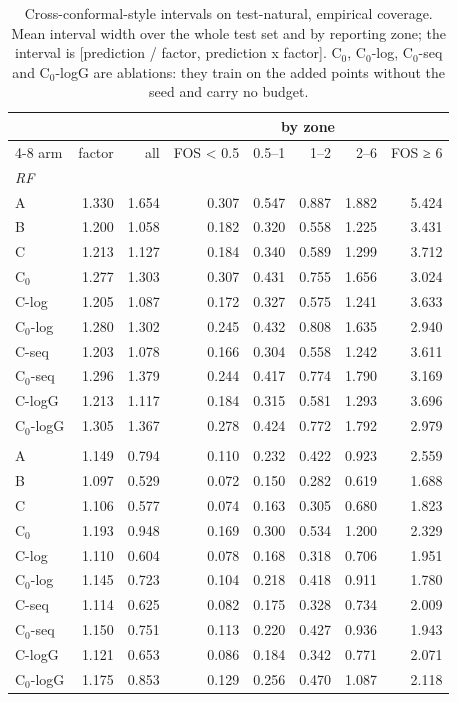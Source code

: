 \begin{table}[htbp]
\centering
\caption{Cross-conformal-style intervals on test-natural, empirical coverage. Mean interval width over the whole test set and by reporting zone; the interval is [prediction / factor, prediction x factor]. C$_0$, C$_0$-log, C$_0$-seq and C$_0$-logG are ablations: they train on the added points without the seed and carry no budget.}
\label{tab:test-natural__fos-rmse:conformal:width}
\begin{tabular}{lrrrrrrr}
\toprule
 &  &  & \multicolumn{5}{c}{by zone} \\
\cmidrule(lr){4-8}
arm & factor & all & FOS < 0.5 & 0.5–1 & 1–2 & 2–6 & FOS ≥ 6 \\
\midrule
\multicolumn{8}{l}{\textit{RF}} \\
A & 1.330 & 1.654 & 0.307 & 0.547 & 0.887 & 1.882 & 5.424 \\
B & 1.200 & 1.058 & 0.182 & 0.320 & 0.558 & 1.225 & 3.431 \\
C & 1.213 & 1.127 & 0.184 & 0.340 & 0.589 & 1.299 & 3.712 \\
C$_0$ & 1.277 & 1.303 & 0.307 & 0.431 & 0.755 & 1.656 & 3.024 \\
C-log & 1.205 & 1.087 & 0.172 & 0.327 & 0.575 & 1.241 & 3.633 \\
C$_0$-log & 1.280 & 1.302 & 0.245 & 0.432 & 0.808 & 1.635 & 2.940 \\
C-seq & 1.203 & 1.078 & 0.166 & 0.304 & 0.558 & 1.242 & 3.611 \\
C$_0$-seq & 1.296 & 1.379 & 0.244 & 0.417 & 0.774 & 1.790 & 3.169 \\
C-logG & 1.213 & 1.117 & 0.184 & 0.315 & 0.581 & 1.293 & 3.696 \\
C$_0$-logG & 1.305 & 1.367 & 0.278 & 0.424 & 0.772 & 1.792 & 2.979 \\
\addlinespace
\multicolumn{8}{l}{\textit{GBM}} \\
A & 1.149 & 0.794 & 0.110 & 0.232 & 0.422 & 0.923 & 2.559 \\
B & 1.097 & 0.529 & 0.072 & 0.150 & 0.282 & 0.619 & 1.688 \\
C & 1.106 & 0.577 & 0.074 & 0.163 & 0.305 & 0.680 & 1.823 \\
C$_0$ & 1.193 & 0.948 & 0.169 & 0.300 & 0.534 & 1.200 & 2.329 \\
C-log & 1.110 & 0.604 & 0.078 & 0.168 & 0.318 & 0.706 & 1.951 \\
C$_0$-log & 1.145 & 0.723 & 0.104 & 0.218 & 0.418 & 0.911 & 1.780 \\
C-seq & 1.114 & 0.625 & 0.082 & 0.175 & 0.328 & 0.734 & 2.009 \\
C$_0$-seq & 1.150 & 0.751 & 0.113 & 0.220 & 0.427 & 0.936 & 1.943 \\
C-logG & 1.121 & 0.653 & 0.086 & 0.184 & 0.342 & 0.771 & 2.071 \\
C$_0$-logG & 1.175 & 0.853 & 0.129 & 0.256 & 0.470 & 1.087 & 2.118 \\
\bottomrule
\end{tabular}
\end{table}
